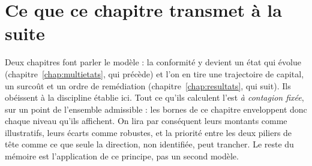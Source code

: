 
\section*{Ce que ce chapitre transmet à la suite}

Deux chapitres font parler le modèle : la conformité y devient un état qui
évolue (chapitre~\ref{chap:multietats}, qui précède) et l'on en tire une trajectoire de capital, un
surcoût et un ordre de remédiation (chapitre~\ref{chap:resultats}, qui suit). Ils obéissent à la
discipline établie ici. Tout ce qu'ils calculent l'est \emph{à contagion fixée}, sur un
point de l'ensemble admissible : les bornes de ce chapitre enveloppent donc chaque niveau
qu'ils affichent. On lira par conséquent leurs montants comme illustratifs, leurs écarts
comme robustes, et la priorité entre les deux piliers de tête comme ce que seule la direction,
non identifiée, peut trancher. Le reste du mémoire est l'application de ce principe, pas un
second modèle.

